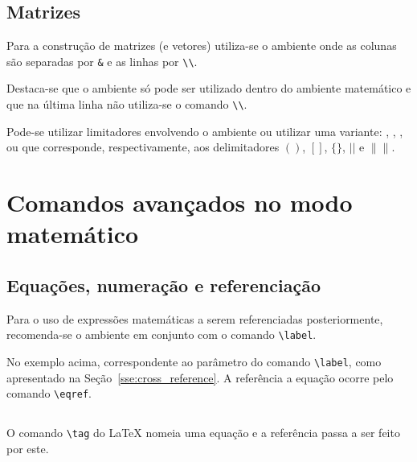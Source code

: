 \subsection{Matrizes}
Para a construção de matrizes (e
vetores) utiliza-se
o ambiente  onde as colunas são separadas por \lstinline!&! e as
linhas por \lstinline!\\!. \\

Destaca-se que o ambiente  só pode ser utilizado dentro do
ambiente matemático e que na última linha não utiliza-se o comando
\lstinline!\\!.

Pode-se utilizar limitadores envolvendo o ambiente  ou utilizar
uma variante: , , ,
 ou  que corresponde, respectivamente, aos
delimitadores $( )$, $[ ]$, $\{ \}$, $| |$ e $\| \|$. \\

\section{Comandos avançados no modo matemático}
\subsection{Equações, numeração e referenciação} \label{sse:latex:equation}
Para o uso de expressões matemáticas a serem referenciadas posteriormente, recomenda-se o
ambiente  em
conjunto com o comando
\lstinline!\label!. \\

No exemplo acima,  correspondente ao parâmetro do comando
\lstinline!\label!, como apresentado na Seção~\ref{sse:cross_reference}. A
referência a equação ocorre pelo comando \lstinline!\eqref!. \\

\subsection{}
O comando \lstinline!\tag! do LaTeX nomeia
uma equação e a
referência passa a ser feito por este. \\

